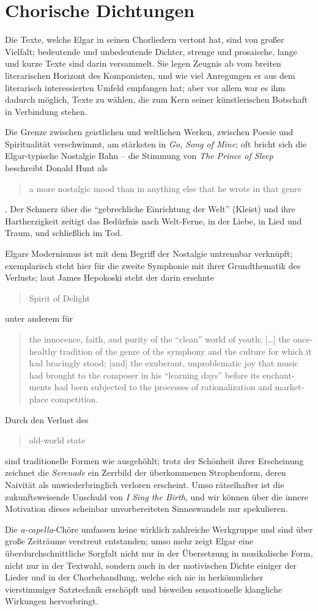 \documentclass[a4paper,11pt,open=any]{scrbook}
\newcommand{\engquote}[1]{\foreignblockquote{english}{#1}}
\begin{document}
\section{Chorische Dichtungen}
Die Texte, welche Elgar in seinen Chorliedern vertont hat, sind von großer
Vielfalt; bedeutende und unbedeutende Dichter, strenge und prosaische, lange
und kurze Texte sind darin versammelt.  Sie legen Zeugnis ab vom breiten
literarischen Horizont des Komponisten, und wie viel Anregungen er aus dem
literarisch interessierten Umfeld empfangen hat; aber vor allem war es ihm
dadurch möglich, Texte zu wählen, die zum Kern seiner künstlerischen Botschaft
in Verbindung stehen.

Die Grenze zwischen geistlichen und weltlichen Werken, zwischen Poesie und
Spiritualität verschwimmt, am stärksten in \textit{Go, Song of Mine}; oft
bricht sich die Elgar-typische Nostalgie Bahn – die Stimmung von \textit{The
Prince of Sleep} beschreibt Donald Hunt als \engquote{a more nostalgic mood
than in anything else that he wrote in that genre}\cite[S.~x]{ece13}.  Der
Schmerz über die \enquote{gebrechliche Einrichtung der Welt} (Kleist) und
ihre Hartherzigkeit zeitigt das Bedürfnis nach Welt-Ferne, in der Liebe,
in Lied und Traum, und schließlich im Tod.

Elgars Modernismus ist mit dem Begriff der Nostalgie untrennbar verknüpft;
exemplarisch steht hier für die zweite Symphonie mit ihrer Grundthematik
des Verlusts; laut James Hepokoski steht der darin ersehnte \engquote{Spirit
of Delight} unter anderem für \engquote{the innocence, faith, and purity of
the \enquote{clean} world of youth; […] the once-healthy tradition of the
genre of the symphony and the culture for which it had bracingly stood; [and]
the exuberant, unproblematic joy that music had brought to the composer
in his \enquote{learning days} before its enchantments had been subjected
to the processes of rationalization and marketplace competition.\cite
[zitiert nach][S.~159]{mark}}
Durch den Verlust des \engquote{old-world state} sind traditionelle
Formen wie ausgehöhlt; trotz der Schönheit ihrer Erscheinung zeichnet
die \textit{Serenade} ein Zerrbild der überkommenen Strophenform, deren
Naivität als unwiederbringlich verloren erscheint.  Umso rätselhafter
ist die zukunftsweisende Unschuld von \textit{I Sing the Birth}, und
wir können über die innere Motivation dieses scheinbar unvorbereiteten
Sinneswandels nur spekulieren.

Die \textit{a-capella}-Chöre umfassen keine wirklich zahlreiche Werkgruppe
und sind über große Zeiträume verstreut entstanden; umso mehr zeigt Elgar
eine überdurchschnittliche Sorgfalt nicht nur in der Übersetzung in
musikalische Form, nicht nur in der Textwahl, sondern auch in der
motivischen Dichte einiger der Lieder und in der Chorbehandlung,
welche sich nie in herkömmlicher vierstimmiger Satztechnik erschöpft
und bisweilen sensationelle klangliche Wirkungen hervorbringt.
\end{document}
